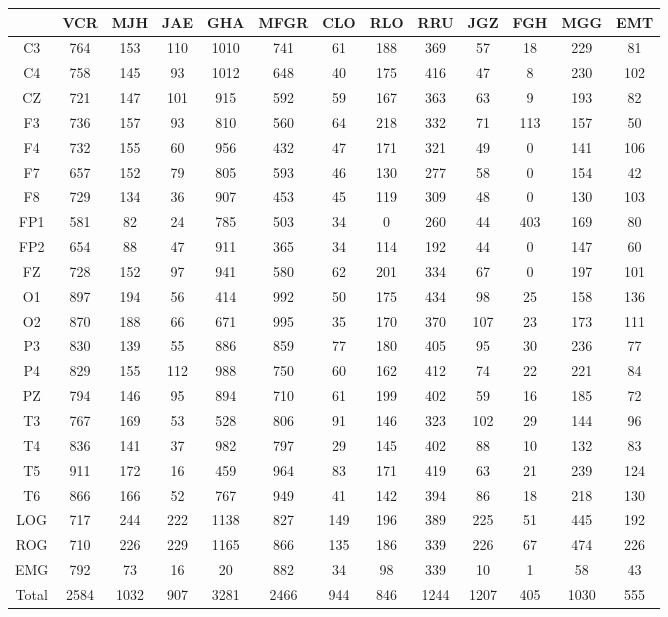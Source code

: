 \begin{SidewaysFigure}
\centering
\begin{tabular}{c|ccccc|cccc|ccc}
& VCR & MJH & JAE & GHA & MFGR
& CLO & RLO & RRU & JGZ
& FGH & MGG & EMT \\
\hline
C3&764&153&110&1010&741&61&188&369&57&18&229&81 \\
C4&758&145&93&1012&648&40&175&416&47&8&230&102 \\
CZ&721&147&101&915&592&59&167&363&63&9&193&82 \\
F3&736&157&93&810&560&64&218&332&71&113&157&50 \\
F4&732&155&60&956&432&47&171&321&49&0&141&106 \\
F7&657&152&79&805&593&46&130&277&58&0&154&42 \\
F8&729&134&36&907&453&45&119&309&48&0&130&103 \\
FP1&581&82&24&785&503&34&0&260&44&403&169&80 \\
FP2&654&88&47&911&365&34&114&192&44&0&147&60 \\
FZ&728&152&97&941&580&62&201&334&67&0&197&101 \\
O1&897&194&56&414&992&50&175&434&98&25&158&136 \\
O2&870&188&66&671&995&35&170&370&107&23&173&111 \\
P3&830&139&55&886&859&77&180&405&95&30&236&77 \\
P4&829&155&112&988&750&60&162&412&74&22&221&84 \\
PZ&794&146&95&894&710&61&199&402&59&16&185&72 \\
T3&767&169&53&528&806&91&146&323&102&29&144&96 \\
T4&836&141&37&982&797&29&145&402&88&10&132&83 \\
T5&911&172&16&459&964&83&171&419&63&21&239&124 \\
T6&866&166&52&767&949&41&142&394&86&18&218&130 \\
LOG&717&244&222&1138&827&149&196&389&225&51&445&192 \\
ROG&710&226&229&1165&866&135&186&339&226&67&474&226 \\
EMG&792&73&16&20&882&34&98&339&10&1&58&43 \\
\hline
Total&2584&1032&907&3281&2466&944&846&1244&1207&405&1030&555
\end{tabular}
\caption{Total de \'epocas PE registradas
(todas las fases) para cada
canal. 
}
\label{total_gpos_total}
\end{SidewaysFigure}






